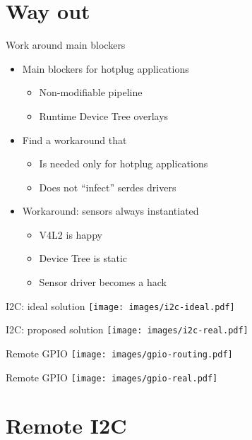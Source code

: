 \documentclass[xetex,table,aspectratio=169]{beamer}
\begin{document}
\section{Way out}

\begin{frame}{Work around main blockers}
  \begin{itemize}
  \item Main blockers for hotplug applications
    \begin{itemize}
    \item Non-modifiable pipeline
    \item Runtime Device Tree overlays
    \end{itemize}
    \pause
  \item Find a workaround that
    \begin{itemize}
    \item Is needed only for hotplug applications
    \item Does not ``infect'' serdes drivers
    \end{itemize}
    \pause
  \item Workaround: sensors always instantiated
    \begin{itemize}
    \item V4L2 is happy
    \item Device Tree is static
    \item Sensor driver becomes a hack
    \end{itemize}
  \end{itemize}
\end{frame}

\begin{frame}{I2C: ideal solution}
  \center\texttt{[image: images/i2c-ideal.pdf]}
\end{frame}

\begin{frame}{I2C: proposed solution}
  \center\texttt{[image: images/i2c-real.pdf]}
\end{frame}

\begin{frame}{Remote GPIO}
  \center\texttt{[image: images/gpio-routing.pdf]}
\end{frame}

\begin{frame}{Remote GPIO}
  \center\texttt{[image: images/gpio-real.pdf]}
\end{frame}


\section{Remote I2C}
\end{document}

